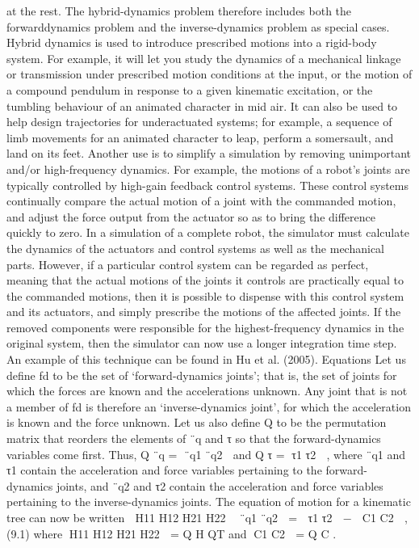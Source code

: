 at the rest. The hybrid-dynamics problem therefore includes both the forwarddynamics problem and the inverse-dynamics problem as special cases. Hybrid dynamics is used to introduce prescribed motions into a rigid-body system. For example, it will let you study the dynamics of a mechanical linkage or transmission under prescribed motion conditions at the input, or the motion of a compound pendulum in response to a given kinematic excitation, or the tumbling behaviour of an animated character in mid air. It can also be used to help design trajectories for underactuated systems; for example, a sequence of limb movements for an animated character to leap, perform a somersault, and land on its feet. Another use is to simplify a simulation by removing unimportant and/or high-frequency dynamics. For example, the motions of a robot’s joints are typically controlled by high-gain feedback control systems. These control systems continually compare the actual motion of a joint with the commanded motion, and adjust the force output from the actuator so as to bring the difference quickly to zero. In a simulation of a complete robot, the simulator must calculate the dynamics of the actuators and control systems as well as the mechanical parts. However, if a particular control system can be regarded as perfect, meaning that the actual motions of the joints it controls are practically equal to the commanded motions, then it is possible to dispense with this control system and its actuators, and simply prescribe the motions of the affected joints. If the removed components were responsible for the highest-frequency dynamics in the original system, then the simulator can now use a longer integration time step. An example of this technique can be found in Hu et al. (2005). Equations Let us define fd to be the set of ‘forward-dynamics joints’; that is, the set of joints for which the forces are known and the accelerations unknown. Any joint that is not a member of fd is therefore an ‘inverse-dynamics joint’, for which the acceleration is known and the force unknown. Let us also define Q to be the permutation matrix that reorders the elements of ¨q and τ so that the forward-dynamics variables come first. Thus, Q ¨q = ¨q1 ¨q2  and Q τ = τ1 τ2  , where ¨q1 and τ1 contain the acceleration and force variables pertaining to the forward-dynamics joints, and ¨q2 and τ2 contain the acceleration and force variables pertaining to the inverse-dynamics joints. The equation of motion for a kinematic tree can now be written  H11 H12 H21 H22  ¨q1 ¨q2  =  τ1 τ2  −  C1 C2  , (9.1) where H11 H12 H21 H22  = Q H QT and C1 C2  = Q C .

